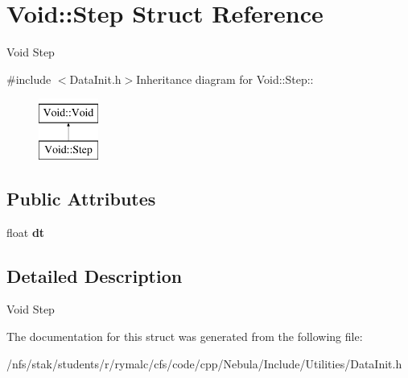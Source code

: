 \hypertarget{structVoid_1_1Step}{
\section{Void::Step Struct Reference}
\label{structVoid_1_1Step}
}


Void Step  


{\ttfamily \#include $<$DataInit.h$>$}Inheritance diagram for Void::Step::\begin{figure}[H]
\begin{center}
\leavevmode
\includegraphics[height=2cm]{structVoid_1_1Step}
\end{center}
\end{figure}
\subsection*{Public Attributes}
\begin{DoxyCompactItemize}
\item 
\hypertarget{structVoid_1_1Step_acbbfdafb8d61b1fabed7e7d361e0c14f}{
float {\bfseries dt}}
\label{structVoid_1_1Step_acbbfdafb8d61b1fabed7e7d361e0c14f}

\end{DoxyCompactItemize}


\subsection{Detailed Description}
Void Step 

The documentation for this struct was generated from the following file:\begin{DoxyCompactItemize}
\item 
/nfs/stak/students/r/rymalc/cfs/code/cpp/Nebula/Include/Utilities/DataInit.h\end{DoxyCompactItemize}
